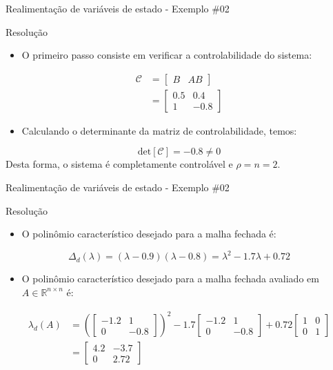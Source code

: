 \begin{frame}{Realimentação de variáveis de estado - Exemplo \#02}
\begin{block}{Resolução}
\begin{itemize}
    \item O primeiro passo consiste em verificar a controlabilidade do sistema:
\end{itemize}
\begin{align*}
    \mathcal{C} &= \begin{bmatrix} B & AB \end{bmatrix} \\
    &= \begin{bmatrix} \num{0,5} & \num{0,4} \\ 1 & -\num{0,8} \end{bmatrix}
\end{align*}
\vspace{-0.3cm}
\begin{itemize}
    \item Calculando o determinante da matriz de controlabilidade, temos:
\end{itemize}
$$\text{det}[\mathcal{C}] = -\num{0,8} \neq 0 $$
Desta forma, o sistema é completamente controlável e $\rho = n = 2$.
\end{block}
\end{frame}

\begin{frame}{Realimentação de variáveis de estado - Exemplo \#02}
\begin{block}{Resolução}
\begin{itemize}
    \item O polinômio característico desejado para a malha fechada é:
\end{itemize}
$$\Delta_d(\lambda) = (\lambda-\num{0,9})(\lambda-\num{0,8}) = \lambda^2 - \num{1,7}\lambda + \num{0,72}$$
\vspace{-0.3cm}
\begin{itemize}
    \item O polinômio característico desejado para a malha fechada avaliado em $A \in \mathbb{R}^{n \times n}$ é:
\end{itemize}
\begin{align*}
    \lambda_d(A) &= \left(\begin{bmatrix}
    -\num{1,2} & 1 \\ 0 & -\num{0,8}
    \end{bmatrix}\right)^2 - \num{1,7} \begin{bmatrix}
    -\num{1,2} & 1 \\ 0 & -\num{0,8}
    \end{bmatrix} + \num{0,72}\begin{bmatrix}
    1 & 0 \\ 0 & 1
    \end{bmatrix} \\
    &= \begin{bmatrix}
    \num{4,2} & -\num{3,7} \\ 0 & \num{2,72}
    \end{bmatrix}
\end{align*}
\end{block}
\end{frame}


